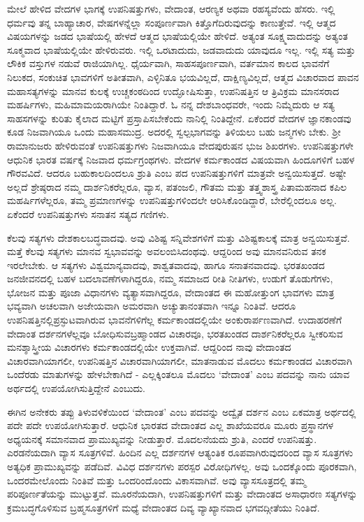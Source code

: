 ಮೇಲೆ ಹೇಳಿದ ವೇದಗಳ ಭಾಗಕ್ಕೆ ಉಪನಿಷತ್ತುಗಳು, ವೇದಾಂತ, ಆರಣ್ಯಕ ಅಥವಾ ರಹಸ್ಯವೆಂದು ಹೆಸರು. ಇಲ್ಲಿ ಧರ್ಮವು ತನ್ನ ಬಾಹ್ಯಾಚಾರ, ವೇಷಗಳನ್ನೆಲ್ಲಾ ಸಂಪೂರ್ಣವಾಗಿ ಕಿತ್ತೊಗೆದಿರುವುದನ್ನು ಕಾಣುತ್ತೇವೆ. ಇಲ್ಲಿ ಆತ್ಮದ ವಿಷಯಗಳನ್ನು ಜಡದ ಭಾಷೆಯಲ್ಲಿ ಹೇಳದೆ ಆತ್ಮದ ಭಾಷೆಯಲ್ಲಿಯೇ ಹೇಳಿದೆ. ಅತ್ಯಂತ ಸೂಕ್ಷ್ಮವಾದುದನ್ನು ಅತ್ಯಂತ ಸೂಕ್ಮವಾದ ಭಾಷೆಯಲ್ಲಿಯೇ ಹೇಳಿರುವರು. ಇಲ್ಲಿ ಒರಟಾದುದು, ಜಡವಾದುದು ಯಾವುದೂ ಇಲ್ಲ. ಇಲ್ಲಿ ಸತ್ಯ ಮತ್ತು ಲೌಕಿಕ ವಸ್ತುಗಳ ನಡುವೆ ರಾಜಿಯಾಗಿಲ್ಲ. ಧೈರ್ಯವಾಗಿ, ಸಾಹಸಪೂರ್ಣವಾಗಿ, ವರ್ತಮಾನ ಕಾಲದ ಭಾವನೆಗೆ ನಿಲುಕದ, ಸಂಕುಚಿತ ಭಾವಗಳಿಗೆ ಅತೀತವಾಗಿ, ಎಳ್ಳಿನಿತೂ ಭಯವಿಲ್ಲದೆ, ದಾಕ್ಷಿಣ್ಯವಿಲ್ಲದೆ, ಆತ್ಮದ ವಿಚಾರವಾದ ಪಾವನ ಮಹಾಸತ್ಯಗಳನ್ನು ಮಾನವ ಕುಲಕ್ಕೆ ಉಚ್ಚಕಂಠದಿಂದ ಉದ್ಘೋಷಿಸುತ್ತಾ, ಉಪನಿಷತ್ತಿನ ಆ ತ್ರಿವಿಕ್ರಮ ಮಾನಸರಾದ ಮಹರ್ಷಿಗಳು, ಮಹಿಮಾಮಯರಾಗಿಯೇ ನಿಂತಿದ್ದಾರೆ. ಓ ನನ್ನ ದೇಶಬಾಂಧವರೇ, ಇಂದು ನಿಮ್ಮೆದುರು ಆ ಸತ್ಯ ಸಾಹಸಗಳನ್ನು ಕುರಿತು ಕೈಲಾದ ಮಟ್ಟಿಗೆ ಪ್ರಸ್ತಾಪಿಸಬೇಕೆಂದು ನಾನಿಲ್ಲಿ ನಿಂತಿದ್ದೇನೆ. ಏಕೆಂದರೆ ವೇದಗಳ ಜ್ಞಾನಕಾಂಡವು ಕೂಡ ನಿಜವಾಗಿಯೂ ಒಂದು ಮಹಾಸಮುದ್ರ. ಅದರಲ್ಲಿ ಸ್ವಲ್ಪಭಾಗವನ್ನು ತಿಳಿಯಲು ಬಹು ಜನ್ಮಗಳು ಬೇಕು. ಶ‍್ರೀ ರಾಮಾನುಜರು ಹೇಳಿರುವಂತೆ ಉಪನಿಷತ್ತುಗಳು ನಿಜವಾಗಿಯೂ ವೇದಪುರುಷನ ಭುಜ ಶಿಖರಗಳು. ಉಪನಿಷತ್ತುಗಳೇ ಆಧುನಿಕ ಭಾರತ ವರ್ಷಕ್ಕೆ ನಿಜವಾದ ಧರ್ಮಗ್ರಂಥಗಳು. ವೇದಗಳ ಕರ್ಮಕಾಂಡದ ವಿಷಯವಾಗಿ ಹಿಂದೂಗಳಿಗೆ ಬಹಳ ಗೌರವವಿದೆ. ಆದರೂ ಬಹುಕಾಲದಿಂದಲೂ ಶ್ರುತಿ ಎಂಬ ಪದ ಉಪನಿಷತ್ತುಗಳಿಗೆ ಮಾತ್ರವೇ ಅನ್ವಯಿಸುತ್ತದೆ. ಅಷ್ಟೇ ಅಲ್ಲದೆ ಶ್ರೇಷ್ಠರಾದ ನಮ್ಮ ದಾರ್ಶನಿಕರೆಲ್ಲರೂ, ವ್ಯಾಸ, ಪತಂಜಲಿ, ಗೌತಮ ಮತ್ತು ತತ್ತ್ವಶಾಸ್ತ್ರ ಪಿತಾಮಹನಾದ ಕಪಿಲ ಮಹರ್ಷಿಗಳೆಲ್ಲರೂ, ತಮ್ಮ ಪ್ರಮಾಣಗಳನ್ನು ಉಪನಿಷತ್ತುಗಳಿಂದಲೇ ಆರಿಸಿಕೊಂಡಿದ್ದಾರೆ, ಬೇರೆಲ್ಲಿಂದಲೂ ಅಲ್ಲ. ಏಕೆಂದರೆ ಉಪನಿಷತ್ತುಗಳು ಸನಾತನ ಸತ್ಯದ ಗಣಿಗಳು.

ಕೆಲವು ಸತ್ಯಗಳು ದೇಶಕಾಲಬದ್ಧವಾದವು. ಅವು ವಿಶಿಷ್ಟ ಸನ್ನಿವೇಶಗಳಿಗೆ ಮತ್ತು ವಿಶಿಷ್ಟಕಾಲಕ್ಕೆ ಮಾತ್ರ ಅನ್ವಯಿಸುತ್ತವೆ. ಮತ್ತೆ ಕೆಲವು ಸತ್ಯಗಳು ಮಾನವ ಸ್ವಭಾವವನ್ನು ಅವಲಂಬಿಸಿದಂಥವು. ಆದ್ದರಿಂದ ಅವು ಮಾನವನಿರುವ ತನಕ ಇರಲೇಬೇಕು. ಆ ಸತ್ಯಗಳು ವಿಶ್ವಮಾನ್ಯವಾದವು, ಶಾಶ್ವತವಾದವು, ಹಾಗೂ ಸನಾತನವಾದವು. ಭರತಖಂಡದ ಜನಜೀವನದಲ್ಲಿ ಬಹಳ ಬದಲಾವಣೆಗಳಾಗಿದ್ದರೂ, ನಮ್ಮ ಸಮಾಜದ ರೀತಿ ನೀತಿಗಳು, ಉಡುಗೆ ತೊಡುಗೆಗಳು, ಭೋಜನ ಮತ್ತು ಪೂಜಾ ವಿಧಾನಗಳು ವ್ಯತ್ಯಾಸವಾಗಿದ್ದರೂ, ವೇದಾಂತದ ಈ ಮಹೋತ್ತುಂಗ ಭಾವಗಳು ಮಾತ್ರ ಭವ್ಯವಾಗಿ ಅಚಲವಾಗಿ ಅಜೇಯವಾಗಿ ಅಮರವಾಗಿ ಅಚ್ಯುತಾನಂತವಾಗಿ ಇನ್ನೂ ನಿಂತಿವೆ. ಆದರೂ ಉಪನಿಷತ್ತಿನಲ್ಲಿ\break ಪ್ರಸ್ಫುಟವಾಗಿರುವ ಭಾವನೆಗಳಿಗೆಲ್ಲ ಕರ್ಮಕಾಂಡದಲ್ಲಿಯೇ ಅಂಕುರಾರ್ಪಣವಾಗಿದೆ. ಉದಾಹರಣೆಗೆ ವೇದಾಂತ ದರ್ಶನಗಳೆಲ್ಲವೂ ಬೋಧಿಸುವ\break ಬ್ರಹ್ಮಾಂಡದ ವಿಚಾರವೂ, ಭರತಖಂಡದ ದಾರ್ಶನಿಕರೆಲ್ಲರೂ ಸ್ವೀಕರಿಸುವ ಮನಶ್ಶಾಸ್ತ್ರೀಯ ವಿಚಾರಗಳು ಕರ್ಮಕಾಂಡದಲ್ಲಿಯೇ ಉಕ್ತವಾಗಿವೆ. ಆದ್ದರಿಂದ ನಾವು ವೇದಾಂತದ ವಿಚಾರವಾಗಿಯಾಗಲೀ, ಉಪನಿಷತ್ತಿನ ವಿಚಾರವಾಗಿಯಾಗಲೀ, ಮಾತನಾಡುವ ಮೊದಲು ಕರ್ಮಕಾಂಡದ ವಿಚಾರವಾಗಿ ಒಂದೆರಡು ಮಾತುಗಳನ್ನು ಹೇಳಬೇಕಾಗಿದೆ - ಎಲ್ಲಕ್ಕಿಂತಲೂ ಮೊದಲು ‘ವೇದಾಂತ’ ಎಂಬ ಪದವನ್ನು ನಾನು ಯಾವ ಅರ್ಥದಲ್ಲಿ ಉಪಯೋಗಿಸುತ್ತಿದ್ದೇನೆ ಎಂಬುದು.

ಈಗಿನ ಅನೇಕರು ತಪ್ಪು ತಿಳುವಳಿಕೆಯಿಂದ ‘ವೇದಾಂತ’ ಎಂಬ ಪದವನ್ನು ಅದ್ವೈತ ದರ್ಶನ ಎಂಬ ಏಕಮಾತ್ರ ಅರ್ಥದಲ್ಲಿ ಪದೇ ಪದೇ ಉಪಯೋಗಿಸುತ್ತಾರೆ. ಆಧುನಿಕ ಭಾರತದ ವೇದಾಂತದ ಎಲ್ಲ ಶಾಖೆಯವರೂ ಮೂರು ಪ್ರಸ್ಥಾನಗಳ ಅಧ್ಯಯನಕ್ಕೆ ಸಮಾನವಾದ ಪ್ರಾಮುಖ್ಯವನ್ನು ನೀಡುತ್ತಾರೆ. ಮೊದಲನೆಯದು ಶ್ರುತಿ, ಎಂದರೆ ಉಪನಿಷತ್ತು. ಎರಡನೆಯದಾಗಿ ವ್ಯಾಸ ಸೂತ್ರಗಳಿವೆ. ಹಿಂದಿನ ಎಲ್ಲ ದರ್ಶನಗಳ ಆತ್ಯಂತಿಕ ರೂಪವಾಗಿರುವುದರಿಂದ ವ್ಯಾಸ ಸೂತ್ರಗಳು ಅತ್ಯಧಿಕ ಪ್ರಾಮುಖ್ಯವನ್ನು ಪಡೆದಿವೆ. ವಿವಿಧ ದರ್ಶನಗಳು ಪರಸ್ಪರ ವಿರೋಧಿಗಳಲ್ಲ. ಅವು ಒಂದಕ್ಕೊಂದು ಪೂರಕವಾಗಿ, ಒಂದರಮೇಲೊಂದು ನಿಂತಿವೆ ಮತ್ತು ಒಂದರಿಂದೊಂದು ವಿಕಾಸವಾಗಿವೆ. ಅವು ವ್ಯಾಸಸೂತ್ರದಲ್ಲಿ ತಮ್ಮ ಪರಿಪೂರ್ಣತೆಯನ್ನು ಮುಟ್ಟುತ್ತವೆ. ಮೂರನೆಯದಾಗಿ, ಉಪನಿಷತ್ತುಗಳಿಗೆ ಮತ್ತು ವೇದಾಂತದ ಅಸಾಧಾರಣ ಸತ್ಯಗಳನ್ನು ಕ್ರಮಬದ್ಧಗೊಳಿಸುವ ಬ್ರಹ್ಮಸೂತ್ರಗಳಿಗೆ ಮಧ್ಯೆ ವೇದಾಂತದ ದಿವ್ಯ ವ್ಯಾಖ್ಯಾನವಾದ ಭಗವದ್ಗೀತೆಯು ನಿಂತಿದೆ.

